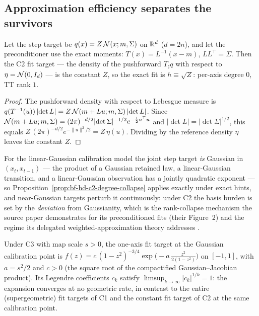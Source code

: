 \subsection{Approximation efficiency separates the survivors}

\begin{proposition}
\label{prop:bf-hd-c2-degree-collapse}
Let the step target be \(q(x)=Z\,\mathcal{N}(x;m,\Sigma)\) on \(\mathbb{R}^{d}\)
(\(d=2n\)), and let the preconditioner use the exact moments:
\(T(x)=L^{-1}(x-m)\), \(LL^{\top}=\Sigma\).  Then the C2 fit target ---
the density of the pushforward \(T_\sharp q\) with respect to
\(\eta=\mathcal{N}(0,I_d)\) --- is the constant \(Z\), so the exact fit is
\(h\equiv\sqrt{Z}\): per-axis degree \(0\), TT rank \(1\).
\end{proposition}

\begin{proof}
The pushforward density with respect to Lebesgue measure is
\(q(T^{-1}(u))\,\lvert\det L\rvert
 =Z\,\mathcal{N}(m+Lu;m,\Sigma)\,\lvert\det L\rvert\).
Since
\(\mathcal{N}(m+Lu;m,\Sigma)
 =(2\pi)^{-d/2}\lvert\det\Sigma\rvert^{-1/2}
  e^{-\frac12 u^{\top}u}\)
and \(\lvert\det L\rvert=\lvert\det\Sigma\rvert^{1/2}\), this equals
\(Z\,(2\pi)^{-d/2}e^{-\lVert u\rVert^2/2}=Z\,\eta(u)\).  Dividing by the
reference density \(\eta\) leaves the constant \(Z\).
\end{proof}

For the linear-Gaussian calibration model the joint step target
\emph{is} Gaussian in \((x_t,x_{t-1})\) --- the product of a Gaussian
retained law, a linear-Gaussian transition, and a linear-Gaussian
observation has a jointly quadratic exponent --- so
Proposition~\ref{prop:bf-hd-c2-degree-collapse} applies exactly under
exact hints, and near-Gaussian targets perturb it continuously: under C2
the basis burden is set by the \emph{deviation} from Gaussianity, which
is the rank-collapse mechanism the source paper demonstrates for its
preconditioned fits (their Figure~2) and the regime its delegated
weighted-approximation theory addresses
\citep{cui2022deep,cui2023selfreinforced}.

\begin{proposition}
\label{prop:bf-hd-c3-subgeometric}
Under C3 with map scale \(s>0\), the one-axis fit target at the Gaussian
calibration point is
\(f(z)=c\,(1-z^2)^{-3/4}\exp\!\bigl(-a\,\tfrac{z^2}{2(1-z^2)}\bigr)\)
on \([-1,1]\), with \(a=s^2/2\) and \(c>0\) (the square root of the
compactified Gaussian--Jacobian product).  Its Legendre coefficients
\(c_k\) satisfy \(\limsup_{k\to\infty}\lvert c_k\rvert^{1/k}=1\): the
expansion converges at no geometric rate, in contrast to the entire
(supergeometric) fit targets of C1 and the constant fit target of C2 at
the same calibration point.
\end{proposition}

